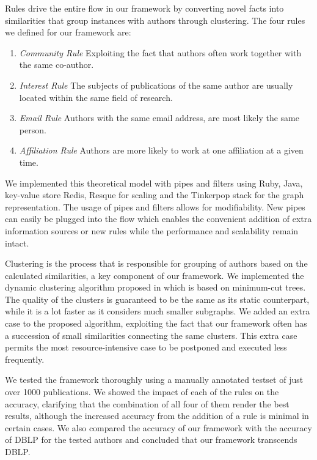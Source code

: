 Rules drive the entire flow in our framework by converting novel facts into similarities that group instances with authors through clustering. The four rules we defined for our framework are:

\begin{enumerate}
	\item \textit{Community Rule} Exploiting the fact that authors often work together with the same co-author.
	\item \textit{Interest Rule} The subjects of publications of the same author are usually located within the same field of research.
	\item \textit{Email Rule} Authors with the same email address, are most likely the same person.
	\item \textit{Affiliation Rule} Authors are more likely to work at one affiliation at a given time.
\end{enumerate}

We implemented this theoretical model with pipes and filters using Ruby, Java, key-value store Redis, Resque for scaling and the Tinkerpop stack for the graph representation. The usage of pipes and filters allows for modifiability. New pipes can easily be plugged into the flow which enables the convenient addition of extra information sources or new rules while the performance and scalability remain intact.

Clustering is the process that is responsible for grouping of authors based on the calculated similarities, a key component of our framework. We implemented the dynamic clustering algorithm proposed in \cite{saha2006dynamic} which is based on minimum-cut trees. The quality of the clusters is guaranteed to be the same as its static counterpart, while it is a lot faster as it considers much smaller subgraphs. We added an extra case to the proposed algorithm, exploiting the fact that our framework often has a succession of small similarities connecting the same clusters. This extra case permits the most resource-intensive case to be postponed and executed less frequently.



We tested the framework thoroughly using a manually annotated testset of just over 1000 publications. We showed the impact of each of the rules on the accuracy, clarifying that the combination of all four of them render the best results, although the increased accuracy from the addition of a rule is minimal in certain cases. We also compared the accuracy of our framework with the accuracy of DBLP for the tested authors and concluded that our framework transcends DBLP.

